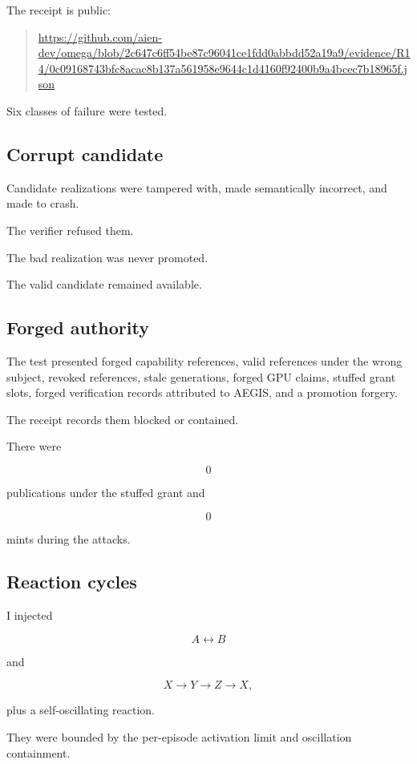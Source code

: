 \documentclass[11pt]{article}
\begin{document}
The receipt is public:

\begin{quote}
\url{https://github.com/aien-dev/omega/blob/2c647c6ff54be87c96041ce1fdd0abbdd52a19a9/evidence/R14/0c09168743bfc8acac8b137a561958e9644c1d4160f92400b9a4bcec7b18965f.json}
\end{quote}

Six classes of failure were tested.

\subsection{Corrupt candidate}

Candidate realizations were tampered with, made semantically incorrect, and made to crash.

The verifier refused them.

The bad realization was never promoted.

The valid candidate remained available.

\subsection{Forged authority}

The test presented forged capability references, valid references under the wrong subject, revoked references, stale generations, forged GPU claims, stuffed grant slots, forged verification records attributed to AEGIS, and a promotion forgery.

The receipt records them blocked or contained.

There were

\[
0
\]

publications under the stuffed grant and

\[
0
\]

mints during the attacks.

\subsection{Reaction cycles}

I injected

\[
A\leftrightarrow B
\]

and

\[
X\rightarrow Y\rightarrow Z\rightarrow X,
\]

plus a self-oscillating reaction.

They were bounded by the per-episode activation limit and oscillation containment.
\end{document}
